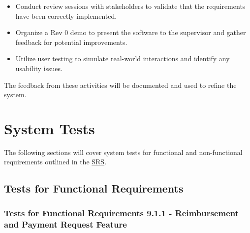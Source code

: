 \documentclass[12pt, titlepage]{article}
\begin{document}
\begin{itemize}
    \item Conduct review sessions with stakeholders to validate that the requirements have been correctly implemented.
    \item Organize a Rev 0 demo to present the software to the supervisor and gather feedback for potential improvements.
    \item Utilize user testing to simulate real-world interactions and identify any usability issues.
\end{itemize}

The feedback from these activities will be documented and used to refine the system.


\section{System Tests}


The following sections will cover system tests for functional and non-functional requirements outlined in the \href{https://github.com/ausbennett/mes-finance-platform/blob/main/docs/SRS/SRS.pdf}{SRS}.

\subsection{Tests for Functional Requirements}



\subsubsection{Tests for Functional Requirements 9.1.1 - Reimbursement and Payment Request Feature}

\end{document}
